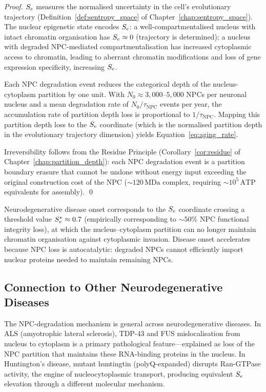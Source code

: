 \begin{proof}
$S_e$ measures the normalised uncertainty in the cell's evolutionary
trajectory (Definition~\ref{def:sentropy_space} of
Chapter~\ref{chap:sentropy_space}). The nuclear epigenetic state encodes
$S_e$: a well-compartmentalised nucleus with intact chromatin organisation
has $S_e \approx 0$ (trajectory is determined); a nucleus with degraded
NPC-mediated compartmentalisation has increased cytoplasmic access to
chromatin, leading to aberrant chromatin modifications and loss of gene
expression specificity, increasing $S_e$.

Each NPC degradation event reduces the categorical depth of the nucleus-
cytoplasm partition by one unit. With $N_0 \approx 3{,}000\text{--}5{,}000$
NPCs per neuronal nucleus and a mean degradation rate of $N_0 / \tau_{\mathrm{NPC}}$
events per year, the accumulation rate of partition depth loss is proportional
to $1/\tau_{\mathrm{NPC}}$. Mapping this partition depth loss to the $S_e$
coordinate (which is the normalised partition depth in the evolutionary
trajectory dimension) yields Equation~\eqref{eq:aging_rate}.

Irreversibility follows from the Residue Principle
(Corollary~\ref{cor:residue} of Chapter~\ref{chap:partition_depth}):
each NPC degradation event is a partition boundary erasure that cannot be
undone without energy input exceeding the original construction cost of the
NPC ($\sim 120\,\mathrm{MDa}$ complex, requiring $\sim 10^5\,\mathrm{ATP}$
equivalents for assembly). \qed
\end{proof}

\begin{corollary}
\label{cor:nd_threshold}
Neurodegenerative disease onset corresponds to the $S_e$ coordinate crossing
a threshold value $S_e^* \approx 0.7$ (empirically corresponding to
$\sim 50\%$ NPC functional integrity loss), at which the nucleus--cytoplasm
partition can no longer maintain chromatin organisation against cytoplasmic
invasion. Disease onset accelerates because NPC loss is autocatalytic:
degraded NPCs cannot efficiently import nuclear proteins needed to maintain
remaining NPCs.
\end{corollary}

\subsection{Connection to Other Neurodegenerative Diseases}

The NPC-degradation mechanism is general across neurodegenerative diseases.
In ALS (amyotrophic lateral sclerosis), TDP-43 and FUS mislocalisation from
nucleus to cytoplasm is a primary pathological feature---explained as loss of
the NPC partition that maintains these RNA-binding proteins in the nucleus.
In Huntington's disease, mutant huntingtin (polyQ-expanded) disrupts Ran-GTPase
activity, the engine of nucleocytoplasmic transport, producing equivalent
$S_e$ elevation through a different molecular mechanism.


